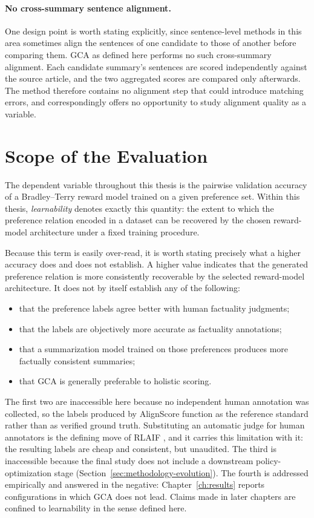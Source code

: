 \paragraph{No cross-summary sentence alignment.} One design point is worth stating
explicitly, since sentence-level methods in this area sometimes align the
sentences of one candidate to those of another before comparing them. GCA as
defined here performs no such cross-summary alignment. Each candidate summary's
sentences are scored independently against the source article, and the two
aggregated scores are compared only afterwards. The method therefore contains no
alignment step that could introduce matching errors, and correspondingly offers no
opportunity to study alignment quality as a variable.

\section{Scope of the Evaluation}
\label{sec:methodology-scope}

The dependent variable throughout this thesis is the pairwise validation accuracy
of a Bradley--Terry reward model trained on a given preference set. Within this
thesis, \emph{learnability} denotes exactly this quantity: the extent to which the
preference relation encoded in a dataset can be recovered by the chosen
reward-model architecture under a fixed training procedure.

Because this term is easily over-read, it is worth stating precisely what a higher
accuracy does and does not establish. A higher value indicates that the generated
preference relation is more consistently recoverable by the selected reward-model
architecture. It does not by itself establish any of the following:

\begin{itemize}
  \item that the preference labels agree better with human factuality judgments;
  \item that the labels are objectively more accurate as factuality annotations;
  \item that a summarization model trained on those preferences produces more
    factually consistent summaries;
  \item that GCA is generally preferable to holistic scoring.
\end{itemize}

The first two are inaccessible here because no independent human annotation was
collected, so the labels produced by AlignScore \citep{zha2023alignscore} function
as the reference standard rather than as verified ground truth. Substituting an
automatic judge for human annotators is the defining move of RLAIF
\citep{bai2022constitutional, lee2023rlaif}, and it carries this limitation with
it: the resulting labels are cheap and consistent, but unaudited. The third is inaccessible because the final
study does not include a downstream policy-optimization stage
(Section~\ref{sec:methodology-evolution}). The fourth is addressed empirically and
answered in the negative: Chapter~\ref{ch:results} reports configurations in which
GCA does not lead. Claims made in later chapters are confined to learnability in
the sense defined here.

